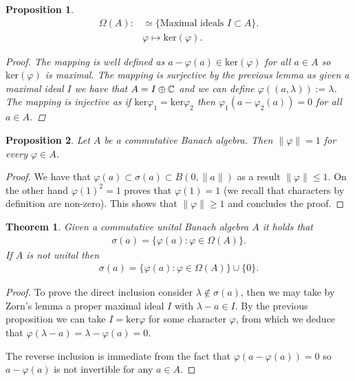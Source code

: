 \documentclass[12pt]{article}
\newtheorem{theorem}{Theorem}
\newtheorem{proposition}{Proposition}
\renewcommand{\norm}[1]{\lVert #1 \rVert}\renewcommand{\abs}[1]{\left| #1 \right|}
\begin{document}
\begin{CJK*}{UTF8}{gbsn}
\begin{proposition}
		\begin{align*}
			\Omega(A): & \simeq \{\text{Maximal ideals } I \subset A\}  . \\
			           & \varphi    \longmapsto \text{ker}(\varphi).
		\end{align*}
		\begin{proof}
			The mapping is well defined as $a -\varphi(a) \in \text{ker}(\varphi)$ for all $a\in  A$ so $\text{ker}(\varphi) $ is maximal. The mapping is surjective by the previous lemma as given a maximal ideal $I$ we have that  $A=I \oplus \mathbb{C}$ and we can define $\varphi((a,\lambda )):= \lambda $. The mapping is injective as if $\text{ker}\varphi_1=\text{ker} \varphi_2   $ then $\varphi_1(a -\varphi_2(a))=0$ for all $a \in  A$.
		\end{proof}
	\end{proposition}
	\begin{proposition}
		Let $A$ be a commutative Banach algebra. Then $\norm{\varphi}=1$ for every $\varphi \in A$.
	\end{proposition}
	\begin{proof}
		We have that $\varphi(a) \subset \sigma (a)\subset B(0,\norm{a})$ as a result $\norm{\varphi}\leq 1$. On the other hand $\varphi(1)^2=1$ proves that $\varphi(1)=1$ (we recall that characters by definition are non-zero). This shows that $\norm{\varphi} \geq 1$ and concludes the proof.
	\end{proof}
	\begin{theorem}
		Given a commutative unital Banach algebra $A$ it holds that
		\begin{align*}
			\sigma (a)=\{\varphi(a): \varphi \in \Omega(A)\} .
		\end{align*}
		If $A$ is not unital then
		\begin{align*}
			\sigma (a)=\{\varphi(a): \varphi \in \Omega(A)\} \cup \{0\}  .
		\end{align*}
	\end{theorem}
	\begin{proof}
		To prove the direct inclusion consider  $\lambda \not\in \sigma (a)$, then we may take by Zorn's lemma a proper maximal ideal $I$ with $\lambda -a \in I$. By the previous proposition we can take $I =\text{ker} \varphi $ for some character $\varphi$, from which we deduce that $\varphi(\lambda -a)=\lambda -\varphi(a)=0$.

		The reverse inclusion is immediate from the fact that $\varphi(a-\varphi(a))=0 $ so $a- \varphi(a)$ is not invertible for any $a \in  A$.


\end{proof}
\end{CJK*}
\end{document}

